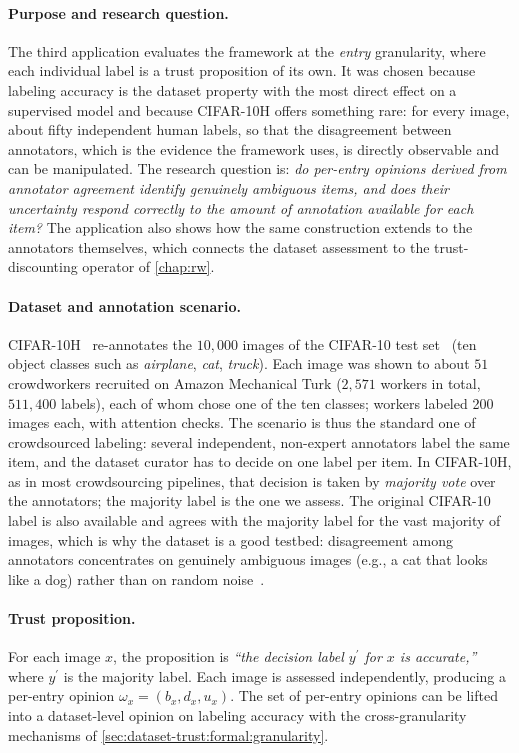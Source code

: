 \paragraph{Purpose and research question.}
The third application evaluates the framework at the \emph{entry} granularity, where each individual label is a trust proposition of its own. It was chosen because labeling accuracy is the dataset property with the most direct effect on a supervised model and because CIFAR-10H offers something rare: for every image, about fifty independent human labels, so that the disagreement between annotators, which is the evidence the framework uses, is directly observable and can be manipulated. The research question is: \emph{do per-entry opinions derived from annotator agreement identify genuinely ambiguous items, and does their uncertainty respond correctly to the amount of annotation available for each item?} The application also shows how the same construction extends to the annotators themselves, which connects the dataset assessment to the trust-discounting operator of \cref{chap:rw}.

\paragraph{Dataset and annotation scenario.}
CIFAR-10H~\cite{peterson2019human} re-annotates the $10{,}000$ images of the CIFAR-10 test set~\cite{krizhevsky2009learningcifar} (ten object classes such as \emph{airplane}, \emph{cat}, \emph{truck}). Each image was shown to about $51$ crowdworkers recruited on Amazon Mechanical Turk ($2{,}571$ workers in total, $511{,}400$ labels), each of whom chose one of the ten classes; workers labeled 200 images each, with attention checks. The scenario is thus the standard one of crowdsourced labeling: several independent, non-expert annotators label the same item, and the dataset curator has to decide on one label per item. In CIFAR-10H, as in most crowdsourcing pipelines, that decision is taken by \emph{majority vote} over the annotators; the majority label is the one we assess. The original CIFAR-10 label is also available and agrees with the majority label for the vast majority of images, which is why the dataset is a good testbed: disagreement among annotators concentrates on genuinely ambiguous images (e.g., a cat that looks like a dog) rather than on random noise~\cite{peterson2019human}.

\paragraph{Trust proposition.}
For each image $x$, the proposition is \emph{``the decision label $y^\prime$ for $x$ is accurate,''} where $y^\prime$ is the majority label. Each image is assessed independently, producing a per-entry opinion $\omega_{x} = (b_{x}, d_{x}, u_{x})$. The set of per-entry opinions can be lifted into a dataset-level opinion on labeling accuracy with the cross-granularity mechanisms of \cref{sec:dataset-trust:formal:granularity}.

